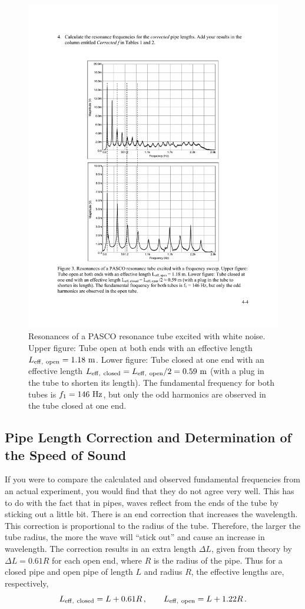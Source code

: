 \documentclass[11pt]{NSF}
\def\be{\begin{equation}}
\def\ee{\end{equation}}
\begin{document}
\begin{figure}[hbtp]
\begin{center}
\includegraphics[width=.7\textwidth]{fig4_3}
\caption{Resonances of a PASCO resonance tube excited with white noise.
Upper figure: Tube open at both ends with an effective length 
$L_{\rm eff,\ open} = 1.18~{\rm m}$.
Lower figure: Tube closed at one end with an effective length 
$L_{\rm eff,\ closed} = L_{\rm eff,\ open}/2 = 0.59~{\rm m}$ 
(with a plug in the tube to shorten its length). 
The fundamental frequency for both tubes is $f_1 = 146~{\rm Hz}$, 
but only the odd harmonics are observed in the tube closed at one end.}
\label{f:3} 
\end{center} 
\end{figure}
%

\subsection{Pipe Length Correction and Determination of the Speed of Sound}

If you were to compare the calculated and observed
fundamental frequencies from an actual experiment,
you would find that they do not agree very well.
This has to do with the fact that in pipes, waves 
reflect from the ends of the tube by sticking out a little bit. 
There is an end correction that increases the wavelength. 
This correction is proportional to the radius of the tube. 
Therefore, the larger the tube radius, the more the wave 
will ``stick out” and cause an increase in wavelength. 
The correction results in an extra length $\Delta L$, 
given from theory by $\Delta L = 0.61 R$ for each open end, 
where $R$ is the radius of the pipe. 
Thus for a closed pipe and open pipe of length $L$ and 
radius $R$, the effective lengths are, respectively,
%
\be
L_{\rm eff,\ closed} = L + 0.61 R\,,
\qquad
L_{\rm eff,\ open} = L + 1.22 R\,.
\ee
\end{document}
